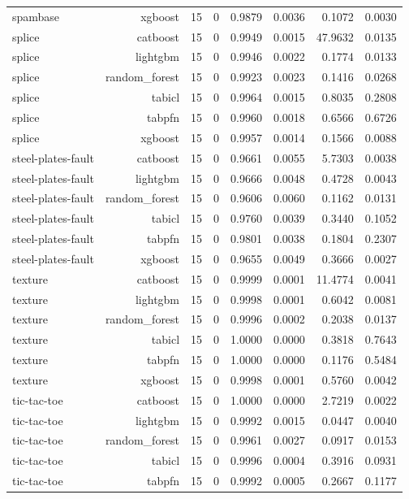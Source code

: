 \begin{table}[htbp]
\begin{tabular}{lrrrrrrr}
spambase & xgboost & 15 & 0 & 0.9879 & 0.0036 & 0.1072 & 0.0030 \\
splice & catboost & 15 & 0 & 0.9949 & 0.0015 & 47.9632 & 0.0135 \\
splice & lightgbm & 15 & 0 & 0.9946 & 0.0022 & 0.1774 & 0.0133 \\
splice & random\_forest & 15 & 0 & 0.9923 & 0.0023 & 0.1416 & 0.0268 \\
splice & tabicl & 15 & 0 & 0.9964 & 0.0015 & 0.8035 & 0.2808 \\
splice & tabpfn & 15 & 0 & 0.9960 & 0.0018 & 0.6566 & 0.6726 \\
splice & xgboost & 15 & 0 & 0.9957 & 0.0014 & 0.1566 & 0.0088 \\
steel-plates-fault & catboost & 15 & 0 & 0.9661 & 0.0055 & 5.7303 & 0.0038 \\
steel-plates-fault & lightgbm & 15 & 0 & 0.9666 & 0.0048 & 0.4728 & 0.0043 \\
steel-plates-fault & random\_forest & 15 & 0 & 0.9606 & 0.0060 & 0.1162 & 0.0131 \\
steel-plates-fault & tabicl & 15 & 0 & 0.9760 & 0.0039 & 0.3440 & 0.1052 \\
steel-plates-fault & tabpfn & 15 & 0 & 0.9801 & 0.0038 & 0.1804 & 0.2307 \\
steel-plates-fault & xgboost & 15 & 0 & 0.9655 & 0.0049 & 0.3666 & 0.0027 \\
texture & catboost & 15 & 0 & 0.9999 & 0.0001 & 11.4774 & 0.0041 \\
texture & lightgbm & 15 & 0 & 0.9998 & 0.0001 & 0.6042 & 0.0081 \\
texture & random\_forest & 15 & 0 & 0.9996 & 0.0002 & 0.2038 & 0.0137 \\
texture & tabicl & 15 & 0 & 1.0000 & 0.0000 & 0.3818 & 0.7643 \\
texture & tabpfn & 15 & 0 & 1.0000 & 0.0000 & 0.1176 & 0.5484 \\
texture & xgboost & 15 & 0 & 0.9998 & 0.0001 & 0.5760 & 0.0042 \\
tic-tac-toe & catboost & 15 & 0 & 1.0000 & 0.0000 & 2.7219 & 0.0022 \\
tic-tac-toe & lightgbm & 15 & 0 & 0.9992 & 0.0015 & 0.0447 & 0.0040 \\
tic-tac-toe & random\_forest & 15 & 0 & 0.9961 & 0.0027 & 0.0917 & 0.0153 \\
tic-tac-toe & tabicl & 15 & 0 & 0.9996 & 0.0004 & 0.3916 & 0.0931 \\
tic-tac-toe & tabpfn & 15 & 0 & 0.9992 & 0.0005 & 0.2667 & 0.1177 \\

\end{tabular}
\end{table}
